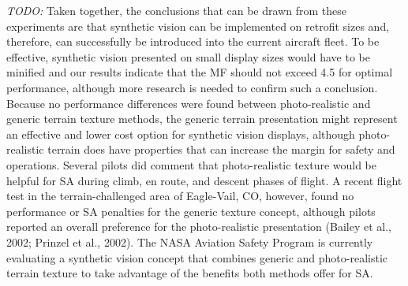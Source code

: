 \documentclass[utf8,bachelor,manualbib]{gradu3}
\begin{document}
\emph{TODO:}
Taken together, the conclusions that can be drawn from these experiments are that
synthetic vision can be implemented on retrofit sizes and, therefore, can successfully
be introduced into the current aircraft fleet. To be effective, synthetic vision
presented on small display sizes would have to be minified and our results indicate
that the MF should not exceed 4.5 for optimal performance, although more research
is needed to confirm such a conclusion.
Because no performance differences were found between photo-realistic and
generic terrain texture methods, the generic terrain presentation might represent an
effective and lower cost option for synthetic vision displays, although photo-realistic
terrain does have properties that can increase the margin for safety and operations.
Several pilots did comment that photo-realistic texture would be helpful for
SA during climb, en route, and descent phases of flight. A recent flight test in the
terrain-challenged area of Eagle-Vail, CO, however, found no performance or SA
penalties for the generic texture concept, although pilots reported an overall preference
for the photo-realistic presentation (Bailey et al., 2002; Prinzel et al., 2002).
The NASA Aviation Safety Program is currently evaluating a synthetic vision concept
that combines generic and photo-realistic terrain texture to take advantage of
the benefits both methods offer for SA. \citep{prinzel2004}
\end{document}
